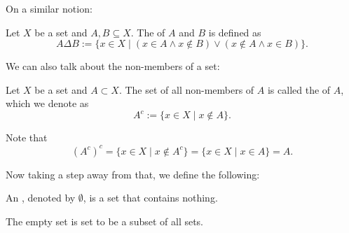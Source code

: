 \documentclass[notoc,notitlepage]{tufte-book}
\begin{document}
On a similar notion:

\begin{defn}\label{defn:symmetric_difference}
Let $X$ be a set and $A, B \subseteq X$. The  of $A$ and $B$ is defined as
  \begin{equation*}
    A \Delta B := \{ x \in X \mid ( x \in A \land x \notin B ) \lor ( x \notin A \land x \in B ) \}.
  \end{equation*}
\end{defn}

We can also talk about the non-members of a set:

\begin{defn}\label{defn:set_complement}
  Let $X$ be a set and $A \subset X$. The set of all non-members of $A$ is called the  of $A$, which we denote as
  \begin{equation*}
    A^c := \{ x \in X \mid x \notin A \}.
  \end{equation*}
\end{defn}

\begin{note}
  Note that
  \begin{equation*}
    {\left( A^c \right)}^c = \{ x \in X \mid x \notin A^c \} = \{ x \in X \mid x \in A \} = A.
  \end{equation*}
\end{note}

Now taking a step away from that, we define the following:

\begin{defn}\label{defn:empty_set}
  An , denoted by $\emptyset$, is a set that contains nothing.
\end{defn}

\begin{note}
  The empty set is set to be a subset of all sets.
\end{note}
\end{document}
